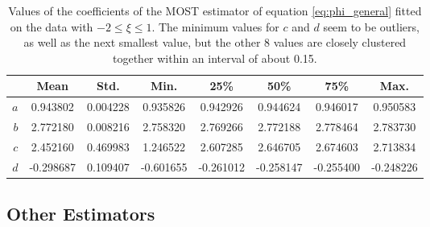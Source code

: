 \documentclass[a4paper]{book}
\begin{document}
\begin{table}[]
\centering
\caption{Values of the coefficients of the MOST estimator of equation \ref{eq:phi_general} fitted on the data with $-2\leq\xi\leq1$. The minimum values for $c$ and $d$ seem to be outliers, as well as the next smallest value, but the other 8 values are closely clustered together within an interval of about 0.15.}
\label{tbl:most_coeffs}
\begin{tabular*}{\textwidth}{r  |@{\extracolsep{\fill}}ccccccc}
\toprule
   & Mean       & Std.       & Min.       & 25\%       & 50\%       & 75\%       & Max. \\ \midrule
$a$   & 0.943802  & 0.004228  & 0.935826  & 0.942926  & 0.944624  & 0.946017  & 0.950583 \\
$b$   & 2.772180  & 0.008216  & 2.758320  & 2.769266  & 2.772188  & 2.778464  & 2.783730 \\
$c$   & 2.452160  & 0.469983  & 1.246522  & 2.607285  & 2.646705  & 2.674603  & 2.713834 \\
$d$   & -0.298687  & 0.109407 & -0.601655 & -0.261012 & -0.258147 & -0.255400 & -0.248226 \\
\bottomrule
\end{tabular*}
\end{table}


\subsection{Other Estimators}
\end{document}

